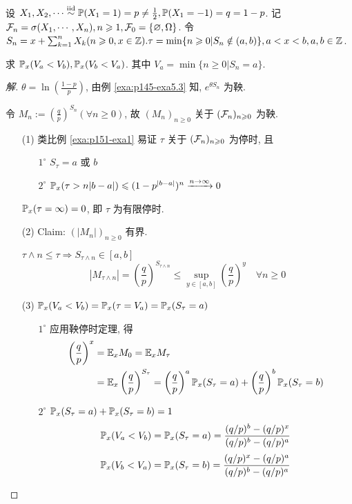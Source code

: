 \begin{example}[不公平赌博的赌徒破产]
    设 $X_1,X_2,\cdots \overset{\text{iid}}{\sim} \mathbb{P}(X_1=1)=p\neq \frac{1}{2}, \mathbb{P}(X_1=-1)=q=1-p$. 记 $\mathcal{F}_n=\sigma(X_1,\cdots,X_n),n\geqslant 1,\mathcal{F}_0=\{\varnothing,\Omega\}$. 令 $S_n=x+\sum_{k=1}^n X_k (n\geqslant 0, x\in \mathbb{Z}). \tau=\min\{n\geqslant 0|S_n\notin (a,b)\}, a<x<b, a,b\in \mathbb{Z}$.

    求 $\mathbb{P}_x(V_a<V_b), \mathbb{P}_x(V_b<V_a)$. 其中 $V_a=\min\{n\geq 0| S_n=a\}$.
\end{example}

\begin{proof}[解]
$\theta=\ln(\frac{1-p}{p})$, 由例 \ref{exa:p145-exa5.3} 知, $e^{\theta S_n}$ 为鞅.

令 $M_n:=(\frac{q}{p})^{S_n}(\forall n\geq 0)$, 故 $(M_n)_{n\geq 0}$ 关于 $(\mathcal{F}_n)_{n\geqslant 0}$ 为鞅.
\begin{enumerate}
    \item[(1)] 类比例 \ref{exa:p151-exa1} 易证 $\tau$ 关于 $(\mathcal{F}_n)_{n\geqslant 0}$ 为停时, 且
    \begin{enumerate}
        \item[$1^{\circ}$] $S_{\tau}=a$ 或 $b$
        \item[$2^{\circ}$] $\mathbb{P}_x(\tau>n|b-a|)\leqslant (1-p^{|b-a|})^n\xrightarrow{n\to\infty}0$  
    \end{enumerate}
    $\mathbb{P}_x(\tau=\infty)=0$, 即 $\tau$ 为有限停时.
    \item[(2)] Claim: $(|M_n|)_{n\geq 0}$ 有界.
    
    $\tau\land n\leq \tau\Rightarrow S_{\tau\land n}\in [a,b]$
    \[
    |M_{\tau\land n}|=\left(\frac{q}{p}\right)^{S_{\tau\land n}}\leq \sup_{y\in [a,b]}\left(\frac{q}{p}\right)^y\quad \forall n\geq 0
    \]
    \item[(3)] $\mathbb{P}_x(V_a<V_b)=\mathbb{P}_x(\tau=V_a)=\mathbb{P}_x(S_{\tau}=a)$
    \begin{enumerate}
        \item[$1^{\circ}$] 应用鞅停时定理, 得
        \[
        \begin{aligned}
            \left(\frac{q}{p}\right)^x &=\mathbb E_x M_0 =\mathbb E_x M_{\tau}\\
            &=\mathbb E_x \left(\frac{q}{p}\right)^{S_{\tau}}=\left(\frac{q}{p}\right)^a\mathbb{P}_x(S_{\tau}=a)+\left(\frac{q}{p}\right)^b\mathbb{P}_x(S_{\tau}=b)
        \end{aligned}
        \]
        \item[$2^{\circ}$] $\mathbb{P}_x(S_{\tau}=a)+\mathbb{P}_x(S_{\tau}=b)=1$
        \[
        \mathbb{P}_x(V_a<V_b)=\mathbb{P}_x(S_{\tau}=a)=\frac{(q/p)^b-(q/p)^x}{(q/p)^b-(q/p)^a}
        \]
        \[
        \mathbb{P}_x(V_b<V_a)=\mathbb{P}_x(S_{\tau}=b)=\frac{(q/p)^x-(q/p)^a}{(q/p)^b-(q/p)^a}
        \]
    \end{enumerate}
\end{enumerate}
\end{proof}


